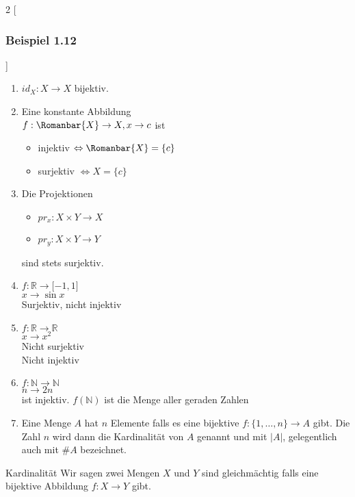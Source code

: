 \begin{multicols}{2}
[\subsubsection*{Beispiel 1.12}]
\begin{enumerate}
\item $id_{X}:X\rightarrow X$ bijektiv.
\item Eine konstante Abbildung \\
	$f:\Romanbar{X}\rightarrow X, x\rightarrow c$ ist 
\begin{itemize}
\item injektiv $\Leftrightarrow \Romanbar{X}=\{ c\}$
\item surjektiv $\Leftrightarrow X=\{ c\}$
\end{itemize}
\item Die Projektionen 
\begin{itemize}
\item $pr_x : X\times Y\rightarrow X$ 
\item $pr_y : X\times Y\rightarrow Y$ 
\end{itemize}
sind stets surjektiv.
\item $f:\mathbb{R}\rightarrow\lbrack -1,1\rbrack$ \\
$x\rightarrow \sin x$\\
Surjektiv, nicht injektiv
\columnbreak
\item $f:\mathbb{R}\rightarrow\mathbb{R}$\\
$x\rightarrow x^2$\\
Nicht surjektiv\\
Nicht injektiv

\item $f:\mathbb{N}\rightarrow\mathbb{N}$\\
$n\rightarrow 2n$\\
ist injektiv. $f(\mathbb{N})$ ist die Menge aller geraden Zahlen
\item Eine Menge $A$ hat $n$ Elemente falls es eine bijektive ${f:\{1,\dots,n\}\rightarrow A}$ gibt. Die Zahl $n$ wird dann die Kardinalität von $A$ genannt und mit $|A|$, gelegentlich auch mit $\#A$ bezeichnet.
\end{enumerate}
\end{multicols}

\begin{definition}{Kardinalität}
Wir sagen zwei Mengen $X$ und $Y$ sind gleichmächtig falls eine bijektive Abbildung $f:X\rightarrow Y$ gibt.
\end{definition}

